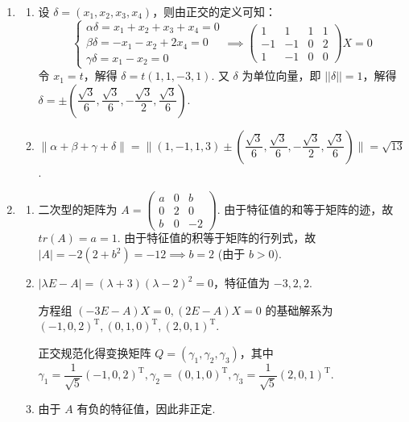 \begin{enumerate}
    \item \begin{enumerate}
        \item 设 $\delta=(x_{1},x_{2},x_{3},x_{4})$，则由正交的定义可知：
        $$
        \begin{cases}
        \alpha\delta=x_{1}+x_{2}+x_{3}+x_{4}=0\\
        \beta\delta=-x_{1}-x_{2}+2x_{4}=0\\
        \gamma\delta=x_1-x_2=0
        \end{cases} \implies \begin{pmatrix}1&1&1&1\\ -1&-1&0&2 \\ 1&-1&0&0 \end{pmatrix}X=0
        $$
        令 $x_{1}=t$，解得 $\delta=t(1,1,-3,1)$. 又 $\delta$ 为单位向量，即 $||\delta||=1$，解得 $\delta=\pm(\dfrac{\sqrt{3}}{6},\dfrac{\sqrt{3}}{6},-\dfrac{\sqrt{3}}{2},\dfrac{\sqrt{3}}{6})$.

        \item $\|\alpha+\beta+\gamma+\delta\|=\|(1,-1,1,3) \pm (\dfrac{\sqrt{3}}{6},\dfrac{\sqrt{3}}{6},-\dfrac{\sqrt{3}}{2},\dfrac{\sqrt{3}}{6})\|=\sqrt{13}$.
    \end{enumerate}

    \item \begin{enumerate}
        \item 二次型的矩阵为 $A=\begin{pmatrix}a&0&b\\ 0&2&0\\ b&0&-2\end{pmatrix}$. 由于特征值的和等于矩阵的迹，故 $tr(A)=a=1$. 由于特征值的积等于矩阵的行列式，故 $|A|=-2(2+b^{2})=-12 \implies b=2$ (由于 $b>0$).

        \item $|\lambda E-A|=(\lambda+3)(\lambda-2)^{2}=0$，特征值为 $-3, 2, 2$.

        方程组 $(-3E-A)X = 0, (2E-A)X = 0$ 的基础解系为 $(-1,0,2)^\mathrm{T}, (0,1,0)^\mathrm{T}, (2,0,1)^\mathrm{T}$.

        正交规范化得变换矩阵 $Q=(\gamma_{1},\gamma_{2},\gamma_{3})$，其中 $\gamma_1=\dfrac{1}{\sqrt{5}}(-1,0,2)^\mathrm{T}, \gamma_2=(0,1,0)^\mathrm{T}, \gamma_3=\dfrac{1}{\sqrt{5}}(2,0,1)^\mathrm{T}$.

        \item 由于 $A$ 有负的特征值，因此非正定.
    \end{enumerate}


\end{enumerate}
